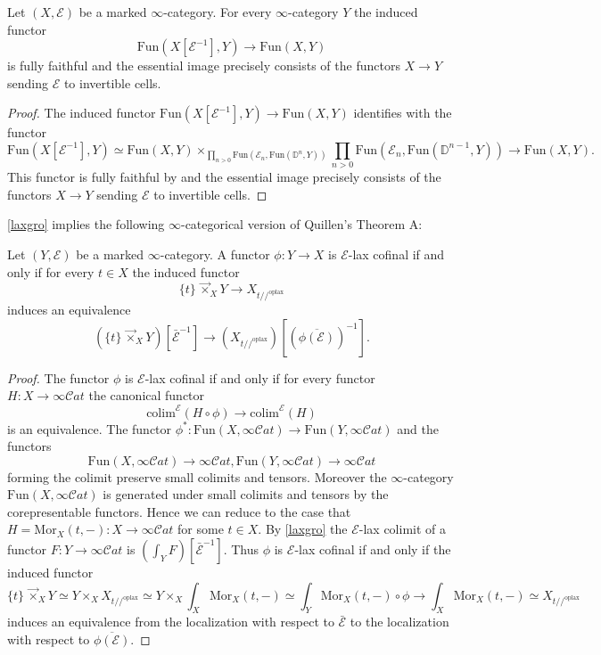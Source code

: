 \documentclass[10pt,oneside]{article}
\numberwithin{equation}{section} %
\numberwithin{figure}{section} %
\theoremstyle{plain}
\theoremstyle{definition}
\newcommand{\bD}{{\mathbb D}}
\newcommand{\mE}{{\mathcal E}}
\newcommand{\X}{X}
\newcommand{\colim}{\mathrm{colim}}
\newcommand{\Fun}{\mathrm{Fun}}
\newcommand{\oplax}{{\mathrm{oplax}}}
\newcommand{\Mor}{{\mathrm{Mor}}}
\newcommand{\scat}{\mathcal{C}\mathit{at}}
\begin{document}
\begin{lemma}

Let $(X,\mE)$ be a marked $\infty$-category.
For every $\infty$-category $Y$ the induced functor
$$ \Fun(X[\mE^{-1}],Y) \to \Fun(X,Y) $$ is fully faithful and the essential image precisely consists of the functors $X \to Y$ sending $\mE$ to invertible cells.

\end{lemma}

\begin{proof}
The induced functor
$ \Fun(X[\mE^{-1}],Y) \to \Fun(X,Y) $ identifies with the functor
$$ \Fun(X[\mE^{-1}],Y) \simeq \Fun(X,Y) \times_{\prod_{n > 0}\Fun(\mE_n, \Fun(\bD^n,Y))} \prod_{n > 0}\Fun(\mE_n,\Fun(\bD^{n-1},Y)) \to \Fun(X,Y). $$
This functor is fully faithful by \cite[Corollary 4.1.4.]{oriented} and the essential image precisely consists of the functors $X \to Y$ sending $\mE$ to invertible cells.
\end{proof}

\cref{laxgro} implies the following $\infty$-categorical version of Quillen's Theorem A:

\begin{theorem}\label{QuillenA}
Let $(Y,\mE)$ be a marked $\infty$-category.
A functor $\phi: Y \to X $ is $\mE$-lax cofinal if
and only if for every $t \in X$
the induced functor $$\{ t \} \,{\vec{\times}}_X Y \to X_{t//^\oplax} $$ induces an equivalence 
$$ (\{ t \} \,{\vec{\times}}_X Y)[{\bar{\mE}^{-1}}] \to (X_{t//^\oplax})
[(\overline{\phi(\mE)})^{-1}].$$ 

\end{theorem}

\begin{proof}

The functor $\phi$ is $\mE$-lax cofinal 
if and only if for every functor $H: X \to \infty\scat$ 
the canonical functor $$ \colim^\mE(H \circ \phi) \to \colim^\mE(H) $$ is an equivalence.
The functor $\phi^*: \Fun(X, \infty\scat) \to \Fun(Y, \infty\scat)$ and the functors $$ \Fun(X, \infty\scat) \to \infty\scat, \Fun(Y, \infty\scat) \to \infty\scat $$ forming the colimit preserve small colimits and tensors. 
Moreover the $\infty$-category $ \Fun(X, \infty\scat)$ is generated under small colimits and tensors by the corepresentable functors.
Hence we can reduce to the case that $H= \Mor_X(t,-): X \to \infty\scat$ for some $t \in X.$
By \cref{laxgro} the $\mE$-lax colimit of a functor $F: Y \to \infty\scat$ is $(\int_Y F)[{\bar{\mE}^{-1}}].$
Thus $\phi$ is $\mE$-lax cofinal if and only if the induced functor $$\{ t \} \,{\vec{\times}}_X Y \simeq Y \times_X X_{t//^\oplax} \simeq Y \times_X \int_X \Mor_X(t,-) \simeq \int_Y \Mor_\X(t,-) \circ \phi \to \int_X \Mor_X(t,-) \simeq X_{t//^\oplax} $$ induces an equivalence from the localization with respect to $\bar{\mE}$ 
to the localization with respect to $\overline{\phi(\mE)}$.
\end{proof}
\end{document}
